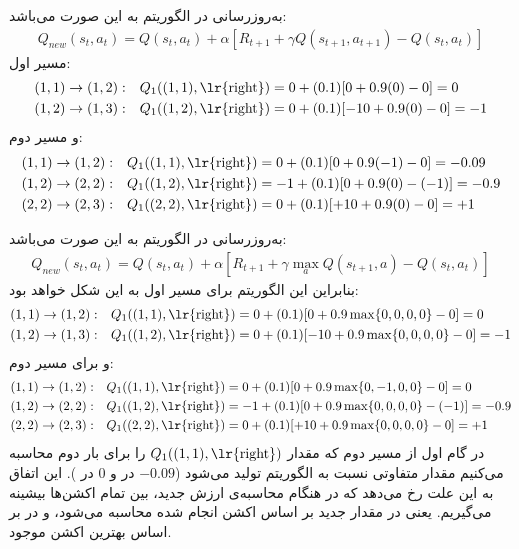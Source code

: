 \begin{ابجد}
\item به‌روزرسانی در الگوریتم  به این صورت می‌باشد:
\begin{align*}
    Q_{new}(s_t, a_t) = Q(s_t, a_t) + \alpha [R_{t+1} + \gamma Q(s_{t+1}, a_{t+1}) - Q(s_t, a_t)]
\end{align*}
مسیر اول:
\begin{align*}
    (1,1) \rightarrow (1,2): & \quad Q_1((1,1), \text{\lr{right}}) = 0 + (0.1) [0 + 0.9(0) - 0] = 0    \\
    (1,2) \rightarrow (1,3): & \quad Q_1((1,2), \text{\lr{right}}) = 0 + (0.1) [-10 + 0.9(0) - 0] = -1
\end{align*}
و مسیر دوم:
\begin{align*}
    (1,1) \rightarrow (1,2): & \quad Q_1((1,1), \text{\lr{right}}) = 0 + (0.1) [0 + 0.9(-1) - 0] = -0.09   \\
    (1,2) \rightarrow (2,2): & \quad Q_1((1,2), \text{\lr{right}}) = -1 + (0.1) [0 + 0.9(0) - (-1)] = -0.9 \\
    (2,2) \rightarrow (2,3): & \quad Q_1((2,2), \text{\lr{right}}) = 0 + (0.1) [+10 + 0.9(0) - 0] = +1
\end{align*}

\item به‌روز‌رسانی در الگوریتم  به این صورت می‌باشد:
\begin{align*}
    Q_{new}(s_t, a_t) = Q(s_t, a_t) + \alpha [R_{t+1} + \gamma \max_a Q(s_{t+1}, a) - Q(s_t, a_t)]
\end{align*}
بنابراین این الگوریتم برای مسیر اول به این شکل خواهد بود:
\begin{align*}
    (1,1) \rightarrow (1,2): & \quad Q_1((1,1), \text{\lr{right}}) = 0 + (0.1) [0 + 0.9\max\{0,0,0,0\} - 0] = 0    \\
    (1,2) \rightarrow (1,3): & \quad Q_1((1,2), \text{\lr{right}}) = 0 + (0.1) [-10 + 0.9\max\{0,0,0,0\} - 0] = -1
\end{align*}
و برای مسیر دوم:
\begin{align*}
    (1,1) \rightarrow (1,2): & \quad Q_1((1,1), \text{\lr{right}}) = 0 + (0.1) [0 + 0.9\max\{0,-1,0,0\} - 0] = 0       \\
    (1,2) \rightarrow (2,2): & \quad Q_1((1,2), \text{\lr{right}}) = -1 + (0.1) [0 + 0.9\max\{0,0,0,0\} - (-1)] = -0.9 \\
    (2,2) \rightarrow (2,3): & \quad Q_1((2,2), \text{\lr{right}}) = 0 + (0.1) [+10 + 0.9\max\{0,0,0,0\} - 0] = +1
\end{align*}
در گام اول از مسیر دوم که مقدار $Q_1((1,1), \text{\lr{right}})$ را برای بار دوم محاسبه می‌کنیم مقدار متفاوتی نسبت به الگوریتم  تولید می‌شود ($-0.09$ در  و $0$ در ). این اتفاق به این علت رخ می‌دهد که در  هنگام محاسبه‌ی ارزش جدید، بین تمام اکشن‌ها بیشینه می‌گیریم. یعنی در  مقدار جدید بر اساس اکشن انجام شده محاسبه می‌شود، و در  بر اساس بهترین اکشن موجود.


\end{ابجد}
